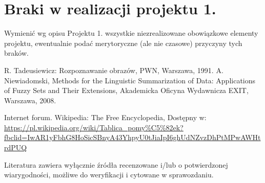 \documentclass{classrep}
\begin{document}


\section{Braki w realizacji projektu 1.}
Wymienić wg opisu Projektu 1. wszystkie niezrealizowane obowiązkowe elementy projektu, ewentualnie
podać merytoryczne (ale nie czasowe) przyczyny tych braków. 


\begin{thebibliography}{0}
 R. Tadeusiewicz: Rozpoznawanie obrazów, PWN, Warszawa, 1991.  
 A. Niewiadomski, Methods for the Linguistic Summarization of Data: Applications of Fuzzy Sets and Their Extensions, Akademicka Oficyna Wydawnicza EXIT, Warszawa, 2008.

 Internet forum. Wikipedia: The Free Encyclopedia, Dostępny w: \url{https://pl.wikipedia.org/wiki/Tablica_pomy%C5%82ek?fbclid=IwAR1yFbhG8HoSicSBnyA43YhpyU0tJiaIpI6ghUdNZvzDhPtMPwAWHtrdPUQ}

\end{thebibliography}

Literatura zawiera wyłącznie źródła recenzowane i/lub o potwierdzonej wiarygodności,
możliwe do weryfikacji i cytowane w sprawozdaniu. 
\end{document}
